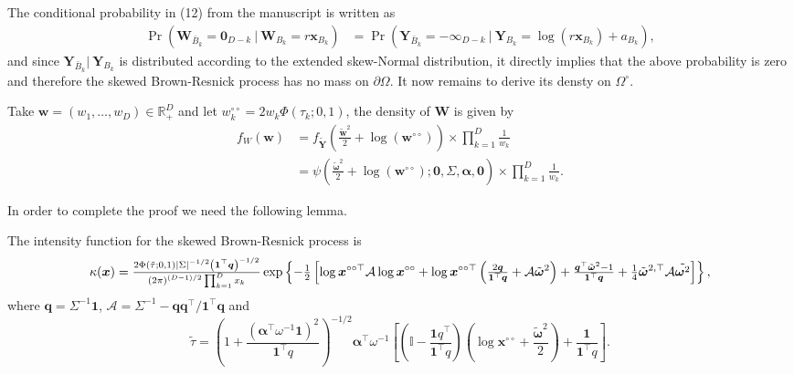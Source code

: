 \documentclass[lineno]{biometrika}
\begin{document}
The conditional probability in (12) from the manuscript is written as
%
\begin{align*}
\Pr(\bm W_{\bar{B}_k} = \bm 0_{D-k} \ | \ \bm W_{B_k} = r \bm x_{B_k} )
& = \Pr(\bm Y_{\bar{B}_k} = - \bm \infty_{D-k} \ | \ \bm Y_{B_k} = \log(r \bm x_{B_k}) + a_{B_k} ),
\end{align*}
and since $\bm Y_{\bar{B}_k}| \ \bm Y_{B_k}$ is distributed according to the extended skew-Normal distribution, it directly implies that the above probability is zero and therefore the skewed Brown-Resnick process has no mass on $\partial\Omega$. It now remains to derive its densty on $\Omega^\circ$.

Take $\bm w = (w_1, \ldots, w_D) \in \mathbb{R}^D_+$ and let $w_k^{\circ\circ} = 2w_k \Phi \left( \tau_k;0,1 \right)$, the density of $\bm W$ is given by
%
\begin{align}
\label{eq:fW_BR}
f_W(\bm w) &= f_{\tilde{\bm Y}} \left( \frac{\tilde{\bm w}^2}{2} + \log\left(\bm w^{\circ\circ}\right) \right) \times \prod_{k=1}^D \frac{1}{w_k} \nonumber \\
&= \psi\left( \frac{\tilde{\bm \omega}^2}{2} + \log\left(\bm w^{\circ\circ}\right); \bm 0, \Sigma, \bm \alpha, \bm 0\right) \times \prod_{k=1}^D \frac{1}{w_k}.
\end{align}
%

In order to complete the proof we need the following lemma.

\begin{lemma}
\label{lem:kappSBR}
The intensity function for the skewed Brown-Resnick process is
$$
\kappa(\bm x) ={\textstyle{2\Phi(\tilde{\tau};0,1)| \Sigma |^{-1/2} \left( \bm 1^\top \bm q\right)^{-1/2}\over\left( 2\pi \right)^{(D-1)/2}\prod_{k=1}^Dx_k}}\exp \left\{ -{\textstyle{1\over2}} \left[ \log \bm x^{\circ\circ\top} \mathcal{A} \log \bm x^{\circ\circ} + \log \bm x^{\circ\circ\top} \left( {\textstyle{2 \bm q\over\bm 1^\top \bm q}}+{\mathcal A}\tilde{\bm\omega}^2\right) + {\textstyle{\bm q^\top\tilde{\bm \omega}^2 - 1\over\bm 1 ^\top \bm q }} + {\textstyle{1\over4}}{\tilde{\bm\omega}}^{2,\top}{\mathcal A}\tilde{\bm\omega^2} \right]\right\},
$$
where $\bm q = \Sigma^{-1} \bm 1$, $\mathcal{A} = \Sigma^{-1} - \bm q \bm q^\top / \bm 1^\top \bm q$ and
%
$$\tilde{\tau}=\left(1 + \frac{\left(\bm\alpha^\top\omega^{-1}\bm 1\right)^2}{\bm 1^\top q}\right)^{-1/2}\bm\alpha^\top\omega^{-1}\left[\left(\mathbb{I} - \frac{\bm 1q^\top}{\bm 1^\top q}\right)\left(\log \bm x^{\circ\circ} + \frac{\tilde{\bm\omega}^2}{2}\right) +  \frac{\bm 1}{\bm 1^\top q} \right].$$
\end{lemma}
\end{document}
